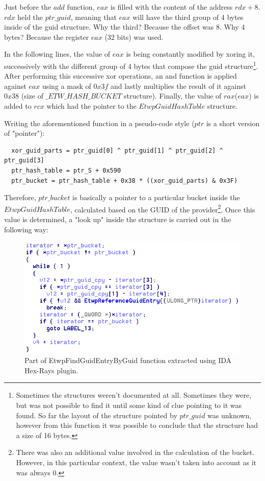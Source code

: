   Just before the $add$ function, $eax$ is filled with the content of the address $rdx+8$. $rdx$ held the $ptr\_guid$, meaning that $eax$ will have the third group of 4 bytes inside of the guid structure. Why the third? Because the offset was 8. Why 4 bytes? Because the register $eax$ (32 bits) was used.

  In the following lines, the value of $eax$ is being constantly modified by xoring it, successively with the different group of 4 bytes that compose the guid structure\footnote{Sometimes the structures weren't documented at all. Sometimes they were, but was not possible to find it until some kind of clue pointing to it was found.  So far the layout of the structure pointed by $ptr\_guid$ was unknown, however from this function it was possible to conclude that the structure had a size of 16 bytes.}. After performing this successive xor operations, an and function is applied against $eax$ using a mask of $0x3f$ and lastly multiplies the result of it against $0x38$ (size of $\_ETW\_HASH\_BUCKET$ structure). Finally, the value of $rax$($eax$) is added to $rcx$ which had the pointer to the $EtwpGuidHashTable$ structure. 

  Writing the aforementioned function in a pseudo-code style ($ptr$ is a short version of "pointer"): 
  \begin{verbatim}
  xor_guid_parts = ptr_guid[0] ^ ptr_guid[1] ^ ptr_guid[2] ^ ptr_guid[3]
  ptr_hash_table = ptr_S + 0x590
  ptr_bucket = ptr_hash_table + 0x38 * ((xor_guid_parts) & 0x3F) 
  \end{verbatim}

  Therefore, $ptr\_bucket$ is basically a pointer to a particular bucket inside the $EtwpGuidHashTable$, calculated based on the GUID of the provider\footnote{There was also an additional value involved in the calculation of the bucket. However, in this particular context, the value wasn't taken into account as it was always 0. }. 
  Once this value is determined, a "look up" inside the structure is carried out in the following way:

  \begin{centering}
  \begin{figure}[H]
    \includegraphics[width=12cm]{images/etwpfindguidentrybyguid_while.png}
    \caption[]{Part of EtwpFindGuidEntryByGuid function extracted using IDA Hex-Rays plugin.}
    \label{fig:EtwpFindGuidEntryByGuid_while}
  \end{figure}
  \end{centering}

